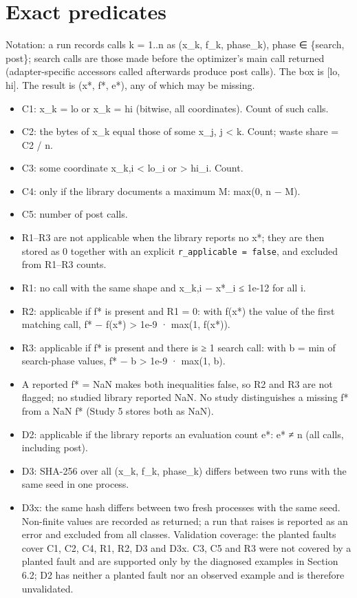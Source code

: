\documentclass[acmsmall,screen,review,anonymous=false]{acmart}
\providecommand{\tightlist}{\setlength{\itemsep}{0pt}\setlength{\parskip}{0pt}}
\begin{document}
\appendix
\section{Exact predicates}\label{exact-predicates}

Notation: a run records calls k = 1..n as (x\_k, f\_k, phase\_k), phase ∈ \{search, post\}; search calls are those made
before the optimizer's main call returned (adapter-specific accessors called afterwards produce post calls). The box
is {[}lo, hi{]}. The result is (x*, f*, e*), any of which may be missing.

\begin{itemize}
\tightlist
\item
  C1: x\_k = lo or x\_k = hi (bitwise, all coordinates). Count of such calls.
\item
  C2: the bytes of x\_k equal those of some x\_j, j \textless{} k. Count; waste share = C2 / n.
\item
  C3: some coordinate x\_k,i \textless{} lo\_i or \textgreater{} hi\_i. Count.
\item
  C4: only if the library documents a maximum M: max(0, n − M).
\item
  C5: number of post calls.
\item
  R1--R3 are not applicable when the library reports no x*; they are then stored as 0 together with an explicit
  \texttt{r\_applicable\ =\ false}, and excluded from R1--R3 counts.
\item
  R1: no call with the same shape and \textbar x\_k,i − x*\_i\textbar{} ≤ 1e-12 for all i.
\item
  R2: applicable if f* is present and R1 = 0: with f(x*) the value of the first matching call,
  \textbar f* − f(x*)\textbar{} \textgreater{} 1e-9 · max(1, \textbar f(x*)\textbar).
\item
  R3: applicable if f* is present and there is ≥ 1 search call: with b = min of search-phase values,
  f* − b \textgreater{} 1e-9 · max(1, \textbar b\textbar).
\item
  A reported f* = NaN makes both inequalities false, so R2 and R3 are not flagged; no studied library reported NaN.
  No study distinguishes a missing f* from a NaN f* (Study 5 stores both as NaN).
\item
  D2: applicable if the library reports an evaluation count e*: e* ≠ n (all calls, including post).
\item
  D3: SHA-256 over all (x\_k, f\_k, phase\_k) differs between two runs with the same seed in one process.
\item
  D3x: the same hash differs between two fresh processes with the same seed.
  Non-finite values are recorded as returned; a run that raises is reported as an error and excluded from all classes.
  Validation coverage: the planted faults cover C1, C2, C4, R1, R2, D3 and D3x. C3, C5 and R3 were not covered by a
  planted fault and are supported only by the diagnosed examples in Section 6.2; D2 has neither a planted fault nor an
  observed example and is therefore unvalidated.
\end{itemize}



\end{document}
